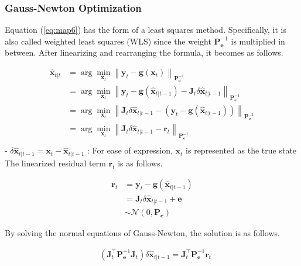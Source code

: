 \documentclass[10pt]{article}
\begin{document}
\subsubsection{Gauss-Newton Optimization}
Equation (\ref{eq:map6}) has the form of a least squares method. Specifically, it is also called weighted least squares (WLS) since the weight $\mathbf{P}_{\mathbf{e}}^{-1}$ is multiplied in between. After linearizing and rearranging the formula, it becomes as follows.

\begin{equation}  
	\begin{aligned} 
		\hat{\mathbf{x}}_{t|t} & = \arg\min_{\mathbf{x}_{t}} \left\| \mathbf{y}_{t} - \mathbf{g}(\mathbf{x}_{t}) \right\|_{\mathbf{P}_{\mathbf{e}}^{-1}} \\ 
		&  = \arg\min_{\mathbf{x}_{t}} \left\| \mathbf{y}_{t} - \mathbf{g}(\hat{\mathbf{x}}_{t|t-1})  - \mathbf{J}_{t} \delta \hat{\mathbf{x}}_{t|t-1} \right\|_{\mathbf{P}_{\mathbf{e}}^{-1}} \\ 
		&  = \arg\min_{\mathbf{x}_{t}} \left\|  \mathbf{J}_{t} \delta \hat{\mathbf{x}}_{t|t-1} - (\mathbf{y}_{t} - \mathbf{g}(\hat{\mathbf{x}}_{t|t-1}) ) \right\|_{\mathbf{P}_{\mathbf{e}}^{-1}} \\ 
		&  = \arg\min_{\mathbf{x}_{t}} \left\|  \mathbf{J}_{t} \delta \hat{\mathbf{x}}_{t|t-1} - \mathbf{r}_{t} \right\|_{\mathbf{P}_{\mathbf{e}}^{-1}} \\ 
	\end{aligned} 
\end{equation}
- $\delta \hat{\mathbf{x}}_{t|t-1} = \mathbf{x}_{t} - \hat{\mathbf{x}}_{t|t-1}$ : For ease of expression, $\mathbf{x}_{t}$ is represented as the true state \\

The linearized residual term $\mathbf{r}_{t}$ is as follows.

\begin{equation}
	\begin{aligned}
		\mathbf{r}_{t} & = \mathbf{y}_{t} -  \mathbf{g}(\hat{\mathbf{x}}_{t|t-1}) \\
		& = \mathbf{J}_{t} \delta \hat{\mathbf{x}}_{t|t-1}  + \mathbf{e} \\ & \sim \mathcal{N}(0, \mathbf{P}_{\mathbf{e}}) 
	\end{aligned}
\end{equation}

By solving the normal equations of Gauss-Newton, the solution is as follows.

\begin{equation}  
	\begin{aligned} 
		& (\mathbf{J}_{t}^{\intercal} \mathbf{P}_{\mathbf{e}}^{-1} \mathbf{J}_{t}) \delta \hat{\mathbf{x}}_{t|t-1} = \mathbf{J}_{t}^{\intercal} \mathbf{P}_{\mathbf{e}}^{-1} \mathbf{r}_{t} \\
	\end{aligned}  
\end{equation}
\end{document}
